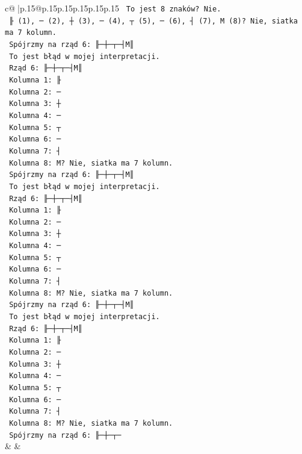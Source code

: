 \documentclass{article}
\begin{document}
{\begin{supertabular}{c@{$\;$}|p{.15\linewidth}@{}p{.15\linewidth}p{.15\linewidth}p{.15\linewidth}p{.15\linewidth}p{.15\linewidth}}
{{{\texttt{    To jest 8 znaków? Nie.} \\
\texttt{    ╟ (1), ─ (2), ┼ (3), ─ (4), ┬ (5), ─ (6), ┤ (7), M (8)? Nie, siatka ma 7 kolumn.} \\
\texttt{    Spójrzmy na rząd 6: ╟─┼─┬─┤M║} \\
\texttt{    To jest błąd w mojej interpretacji.} \\
\texttt{    Rząd 6: ╟─┼─┬─┤M║} \\
\texttt{    Kolumna 1: ╟} \\
\texttt{    Kolumna 2: ─} \\
\texttt{    Kolumna 3: ┼} \\
\texttt{    Kolumna 4: ─} \\
\texttt{    Kolumna 5: ┬} \\
\texttt{    Kolumna 6: ─} \\
\texttt{    Kolumna 7: ┤} \\
\texttt{    Kolumna 8: M? Nie, siatka ma 7 kolumn.} \\
\texttt{    Spójrzmy na rząd 6: ╟─┼─┬─┤M║} \\
\texttt{    To jest błąd w mojej interpretacji.} \\
\texttt{    Rząd 6: ╟─┼─┬─┤M║} \\
\texttt{    Kolumna 1: ╟} \\
\texttt{    Kolumna 2: ─} \\
\texttt{    Kolumna 3: ┼} \\
\texttt{    Kolumna 4: ─} \\
\texttt{    Kolumna 5: ┬} \\
\texttt{    Kolumna 6: ─} \\
\texttt{    Kolumna 7: ┤} \\
\texttt{    Kolumna 8: M? Nie, siatka ma 7 kolumn.} \\
\texttt{    Spójrzmy na rząd 6: ╟─┼─┬─┤M║} \\
\texttt{    To jest błąd w mojej interpretacji.} \\
\texttt{    Rząd 6: ╟─┼─┬─┤M║} \\
\texttt{    Kolumna 1: ╟} \\
\texttt{    Kolumna 2: ─} \\
\texttt{    Kolumna 3: ┼} \\
\texttt{    Kolumna 4: ─} \\
\texttt{    Kolumna 5: ┬} \\
\texttt{    Kolumna 6: ─} \\
\texttt{    Kolumna 7: ┤} \\
\texttt{    Kolumna 8: M? Nie, siatka ma 7 kolumn.} \\
\texttt{    Spójrzmy na rząd 6: ╟─┼─┬─} \\
            }
        }
    }
    & & \\ \\


\end{supertabular}}
\end{document}
